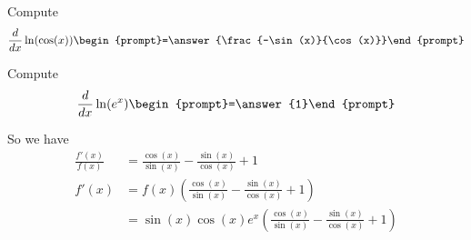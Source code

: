 \documentclass{ximera}
\begin{document}
\begin{problem}
  Compute %
  \[
  \ddx \ln(\cos(x))  \begin{prompt}=\answer{\frac{-\sin(x)}{\cos(x)}}\end{prompt}
  \]
\end{problem}

\begin{problem}
  Compute %
  \[
  \ddx \ln(e^x)  \begin{prompt}=\answer{1}\end{prompt}
  \]
\end{problem}

So we have
\begin{align*}
  \frac{f'(x)}{f(x)} &= \frac{\cos(x)}{\sin(x)} - \frac{\sin(x)}{\cos(x)} + 1\\
  f'(x) &= f(x) \left(\frac{\cos(x)}{\sin(x)} - \frac{\sin(x)}{\cos(x)} + 1\right)\\
  &= \sin(x)\cos(x)e^x\left(\frac{\cos(x)}{\sin(x)} - \frac{\sin(x)}{\cos(x)} + 1\right)
\end{align*}




\end{document}
